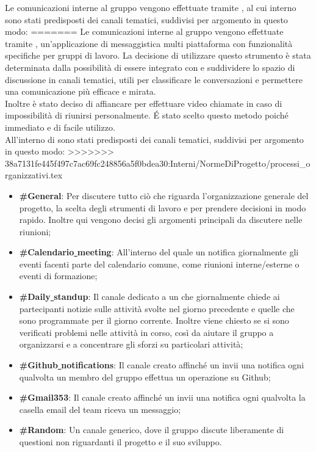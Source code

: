 \documentclass[NormeDiProgetto.tex]{subfiles}
\begin{document}
	Le comunicazioni interne al gruppo vengono effettuate tramite , al cui interno sono stati predisposti dei canali tematici, suddivisi per argomento in questo modo:
=======
	Le comunicazioni interne al gruppo vengono effettuate tramite , un'applicazione di messaggistica multi piattaforma con funzionalità specifiche per gruppi di lavoro. La decisione di utilizzare questo strumento è stata determinata dalla possibilità di essere integrato con  e suddividere lo spazio di discussione in canali tematici, utili per classificare le conversazioni e permettere una comunicazione più efficace e mirata.\\
	Inoltre è stato deciso di affiancare  per effettuare video chiamate in caso di impossibilità di riunirsi personalmente. \'{E} stato scelto questo metodo poiché immediato e di facile utilizzo.\\
	All'interno di  sono stati predisposti dei canali tematici, suddivisi per argomento in questo modo:
>>>>>>> 38a7131fe445f497c7ac69fc248856a5f0bdea30:Interni/NormeDiProgetto/processi_organizzativi.tex
	\begin{itemize}
		\item \textbf{\#General}: Per discutere tutto ciò che riguarda l'organizzazione generale del progetto, la scelta degli strumenti di lavoro e per prendere decisioni in modo rapido. Inoltre qui vengono decisi gli argomenti principali da discutere nelle riunioni;
		\item \textbf{\#Calendario\underline{ }meeting}: All'interno del quale un  notifica giornalmente gli eventi facenti parte del calendario comune, come riunioni interne/esterne o eventi di formazione;
		\item \textbf{\#Daily\underline{ }standup}: Il canale dedicato a un  che giornalmente chiede ai partecipanti notizie sulle attività svolte nel giorno precedente e quelle che sono programmate per il giorno corrente. Inoltre viene chiesto se si sono verificati problemi nelle attività in corso, così da aiutare il gruppo a organizzarsi e a concentrare gli sforzi su particolari attività;
		\item \textbf{\#Github\underline{ }notifications}: Il canale creato affinché un  invii una notifica ogni qualvolta un membro del gruppo effettua un operazione su Github;
		\item \textbf{\#Gmail353}: Il canale creato affinché un  invii una notifica ogni qualvolta la casella email del team riceva un messaggio;
		\item \textbf{\#Random}: Un canale generico, dove il gruppo discute liberamente di questioni non riguardanti il progetto e il suo sviluppo.	
	\end{itemize}
\end{document}
